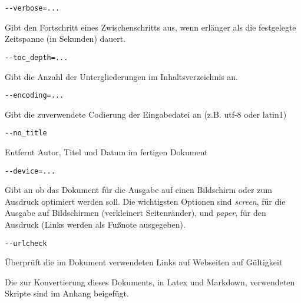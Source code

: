 \documentclass[%
oneside,                 %
final,                   %
chapterprefix=true,      %
open=right,              %
10pt]{book}
\begin{document}
\begin{verbatim}
--verbose=...
\end{verbatim}

Gibt den Fortschritt eines Zwischenschritts aus, wenn erlänger als die festgelegte Zeitspanne (in Sekunden) dauert.

\begin{verbatim}
--toc_depth=...
\end{verbatim}

Gibt die Anzahl der Untergliederungen im Inhaltsverzeichnis an.

\begin{verbatim}
--encoding=...
\end{verbatim}

Gibt die zuverwendete Codierung der Eingabedatei an (z.B. utf-8 oder latin1)

\begin{verbatim}
--no_title
\end{verbatim}

Entfernt Autor, Titel und Datum im fertigen Dokument

\begin{verbatim}
--device=...
\end{verbatim}

Gibt an ob das Dokument für die Ausgabe auf einen Bildschirm oder zum Ausdruck optimiert werden soll. Die wichtigsten Optionen sind \emph{screen}, für die Ausgabe auf Bildschirmen (verkleinert Seitenränder), und \emph{paper}, für den Ausdruck (Links werden als Fußnote ausgegeben).

\begin{verbatim}
--urlcheck
\end{verbatim}

Überprüft die im Dokument verwendeten Links auf Webseiten auf Gültigkeit

Die zur Konvertierung dieses Dokuments, in Latex und Markdown, verwendeten Skripte sind im Anhang beigefügt.
\end{document}
